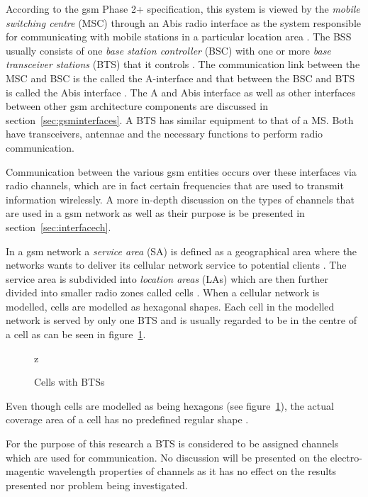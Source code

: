 According to the \gls{gsm} Phase 2+ specification, this system is viewed by the \emph{mobile switching centre} (MSC) through an Abis radio interface as the system responsible for communicating with mobile stations in a particular location area \cite{Eisenblatter}. The BSS usually consists of one \emph{base station controller} (BSC) with one or more \emph{base transceiver stations} (BTS) that it controls \cite{Eisenblatter}. The communication link between the MSC and BSC is the called the A-interface and that between the BSC and BTS is called the Abis interface \cite{Eisenblatter}. The A and Abis interface as well as other interfaces between other \gls{gsm} architecture components are discussed in section~\ref{sec:gsminterfaces}. A BTS has similar equipment to that of a MS\cite{GSMSysEngin}. Both have transceivers, antennae and the necessary functions to perform radio communication. 

Communication between the various \gls{gsm} entities occurs over these interfaces via radio channels, which are in fact certain frequencies that are used to transmit information wirelessly. A more in-depth discussion on the types of channels that are used in a \gls{gsm} network as well as their purpose is be presented in section~\ref{sec:interfacech}.

In a \gls{gsm} network a \emph{service area} (SA) is defined as a geographical area where the networks wants to deliver its cellular network service to potential clients \cite{GSMArchitectureProtocolsServices, Karen2004}. The service area is subdivided into \emph{location areas} (LAs) which are then further divided into smaller radio zones called cells \cite{GSMSecurInTeleNetwork}. When a cellular network is modelled, cells are modelled as hexagonal shapes. Each cell in the modelled network is served by only one BTS and is usually regarded to be in the centre of a cell as can be seen in figure~\ref{fig:GSMCell}\cite{GSMArchitectureProtocolsServices}. 
\begin{figure}[H]
	\begin{centering}
		
		\caption{Cells with BTSs}
		\label{fig:GSMCell}
	\end{centering}z
\end{figure}
Even though cells are modelled as being hexagons (see figure~\ref{fig:GSMCell}), the actual coverage area of a cell has no predefined regular shape \cite{GSMArchitectureProtocolsServices}.

For the purpose of this research a BTS is considered to be assigned channels which are used for communication. No discussion will be presented on the electro-magentic wavelength properties of channels as it has no effect on the results presented nor problem being investigated.

